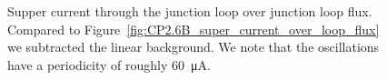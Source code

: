 \begin{figure}[h]
	\centering
	
	\caption{Supper current through the junction loop over junction loop flux. Compared to Figure~\ref{fig:CP2.6B_super_current_over_loop_flux} we subtracted the linear background. We note that the oscillations have a periodicity of roughly \qty{60}{\micro\ampere}.}
	\label{fig:CP2.6B_super_current_over_phase_no_linear_background}
\end{figure}

